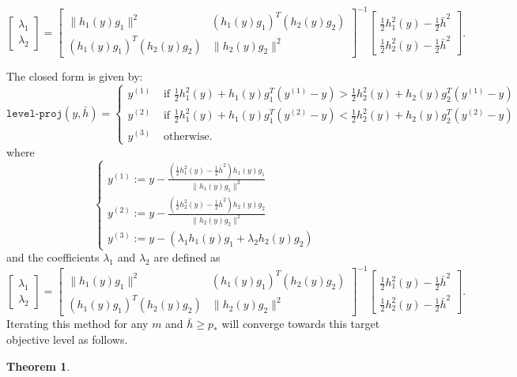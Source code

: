 \documentclass[sn-mathphys,Numbered]{sn-jnl}%
\newtheorem{theorem}{Theorem}%
\begin{document}
\begin{appendices}
{\begin{enumerate}
    $$ \begin{bmatrix} \lambda_1 \\ \lambda_2 \end{bmatrix}=\begin{bmatrix} \|h_1(y)g_{1}\|^2 &{ (h_1(y)g_{1})}^T(h_2(y)g_{2}) \\ (h_1(y){ g_{1}})^T (h_2(y)g_{2}) & \|h_2(y)g_{2}\|^2 \end{bmatrix}^{-1} \begin{bmatrix} \frac{1}{2}h^2_1(y)-\frac{1}{2}\bar{h}^2 \\ \frac{1}{2}h^2_2(y)-\frac{1}{2}\bar{h}^2 \end{bmatrix}. $$
\end{enumerate}
The closed form is given by:
$$ \mathtt{level\mbox{-}proj}(y,\bar h) = \begin{cases}
y^{(1)} & \text{ if } \frac{1}{2}h^2_1(y) + h_1(y)g_{1}^T(y^{(1)}-y) > \frac{1}{2}h^2_2(y) + h_2(y)g_{2}^T(y^{(1)}-y)\\
y^{(2)} & \text{ if } \frac{1}{2}h^2_1(y) + h_1(y)g_{1}^T(y^{(2)}-y) < \frac{1}{2}h^2_2(y) + h_2(y)g_{2}^T(y^{(2)}-y)\\
y^{(3)} & \text{ otherwise.}
\end{cases}$$
where $$\begin{cases}y^{(1)} := y - \frac{(\frac{1}{2}h^2_1(y) - \frac{1}{2}\bar h^2)h_1(y)g_{1}}{\|h_1(y)g_{1}\|^2} \\ 
y^{(2)} := y - \frac{(\frac{1}{2}h^2_2(y) - \frac{1}{2}\bar h^2)h_2(y)g_{2}}{\|h_2(y)g_{2}\|^2} \\ 
y^{(3)}:=y-(\lambda_1h_1(y)g_{1}+\lambda_2h_2(y)g_{2})
\end{cases}$$
and the coefficients $\lambda_1$ and $\lambda_2$ are defined as
$$ \begin{bmatrix} \lambda_1 \\ \lambda_2 \end{bmatrix}=\begin{bmatrix} \|h_1(y)g_{1}\|^2 &{ (h_1(y)g_{1})}^T(h_2(y)g_{2}) \\ (h_1(y){ g_{1}})^T (h_2(y)g_{2}) & \|h_2(y)g_{2}\|^2 \end{bmatrix}^{-1} \begin{bmatrix} \frac{1}{2}h^2_1(y)-\frac{1}{2}\bar{h}^2 \\ \frac{1}{2}h^2_2(y)-\frac{1}{2}\bar{h}^2 \end{bmatrix}. $$
Iterating this method for any $m$ and $\bar h \geq p_*$ will converge towards this target objective level as follows.
\begin{theorem}\label{thm:level-proj-convergence}

\end{theorem}}
\end{appendices}
\end{document}
